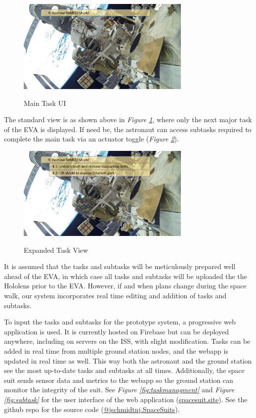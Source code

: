 \documentclass{article}
\begin{document}
\begin{figure}[!htb]
  \centering
  \caption{Main Task UI}
  \includegraphics[width=0.75\textwidth]{assets/task4.png}
  \label{fig:task4}
\end{figure}

The standard view is as shown above in \textit{Figure \ref{fig:task4}}, where only the next major task of the EVA is displayed. If need be, the astronaut can access subtasks required to complete the main task via an actuator toggle (\textit{Figure \ref{fig:moresubtasks}}).

\begin{figure}[!htb]
  \centering
  \caption{Expanded Task View}
  \includegraphics[width=0.75\textwidth]{assets/moresubtasks.png}
  \label{fig:moresubtasks}
\end{figure}

It is assumed that the tasks and subtasks will be meticulously prepared well ahead of the EVA, in which case all tasks and subtasks will be uploaded the the Hololens prior to the EVA. However, if and when plans change during the space walk, our system incorporates real time editing and addition of tasks and subtasks.

To input the tasks and subtasks for the prototype system, a progressive web application is used. It is currently hosted on Firebase but can be deployed anywhere, including on servers on the ISS, with slight modification. Tasks can be added in real time from multiple ground station nodes, and the webapp is updated in real time as well. This way both the astronaut and the ground station see the most up-to-date tasks and subtasks at all times. Additionally, the space suit sends sensor data and metrics to the webapp so the ground station can monitor the integrity of the suit. See \textit{Figure \ref{fig:taskmanagment}} and \textit{Figure \ref{fig:subtask}} for the user interface of the web application (\href{https://spacesuit.site}{spacesuit.site}). See the github repo for the source code (\href{https://github.com/jschmidtnj/spacesuits}{@jschmidtnj.SpaceSuits}).
\end{document}

